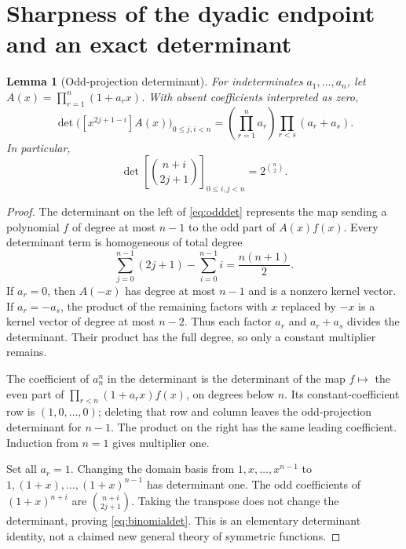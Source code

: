 \documentclass[11pt,a4paper]{article}
\newtheorem{lemma}[theorem]{Lemma}
\theoremstyle{definition}\newtheorem{definition}[theorem]{Definition}
\theoremstyle{remark}\newtheorem{remark}[theorem]{Remark}
\begin{document}
\section{Sharpness of the dyadic endpoint and an exact determinant}\label{sec:sharpwindow}
\begin{lemma}[Odd-projection determinant]\label{lem:binomial}
For indeterminates $a_1,\ldots,a_n$, let $A(x)=\prod_{r=1}^n(1+a_rx)$. With absent coefficients interpreted as zero,
\begin{equation}\label{eq:odddet}
\det\bigl([x^{2j+1-i}]A(x)\bigr)_{0\le j,i<n}
=\left(\prod_{r=1}^na_r\right)\prod_{r<s}(a_r+a_s).
\end{equation}
In particular,
\begin{equation}\label{eq:binomialdet}
\det\!\left[\binom{n+i}{2j+1}\right]_{0\le i,j<n}=2^{\binom n2}.
\end{equation}
\end{lemma}
\begin{proof}
The determinant on the left of \eqref{eq:odddet} represents the map sending a polynomial $f$ of degree at most $n-1$ to the odd part of $A(x)f(x)$. Every determinant term is homogeneous of total degree
\[
\sum_{j=0}^{n-1}(2j+1)-\sum_{i=0}^{n-1}i=\frac{n(n+1)}2.
\]
If $a_r=0$, then $A(-x)$ has degree at most $n-1$ and is a nonzero kernel vector. If $a_r=-a_s$, the product of the remaining factors with $x$ replaced by $-x$ is a kernel vector of degree at most $n-2$. Thus each factor $a_r$ and $a_r+a_s$ divides the determinant. Their product has the full degree, so only a constant multiplier remains.

The coefficient of $a_n^n$ in the determinant is the determinant of the map $f\mapsto$ the even part of $\prod_{r<n}(1+a_rx)f(x)$, on degrees below $n$. Its constant-coefficient row is $(1,0,\ldots,0)$; deleting that row and column leaves the odd-projection determinant for $n-1$. The product on the right has the same leading coefficient. Induction from $n=1$ gives multiplier one.

Set all $a_r=1$. Changing the domain basis from $1,x,\ldots,x^{n-1}$ to $1,(1+x),\ldots,(1+x)^{n-1}$ has determinant one. The odd coefficients of $(1+x)^{n+i}$ are $\binom{n+i}{2j+1}$. Taking the transpose does not change the determinant, proving \eqref{eq:binomialdet}. This is an elementary determinant identity, not a claimed new general theory of symmetric functions.
\end{proof}
\end{document}
